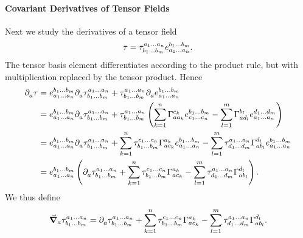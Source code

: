 \paragraph{Covariant Derivatives of Tensor Fields}
Next we study the derivatives of a tensor field
\begin{align*}
	\tau = \tensor*{\tau}{^{a_{1}\dots a_{n}}_{b_{1}\dots b_{m}}}\tensor*{e}{^{b_{1}\dots b_{m}}_{a_{1}\dots a_{n}}}.
\end{align*}
The tensor basis element differentiates according to the product rule, but with multiplication replaced by the tensor product. Hence
\begin{align*}
	\del{}{a}{\tau} &= \tensor*{e}{^{b_{1}\dots b_{m}}_{a_{1}\dots a_{n}}}\del{}{a}{\tensor*{\tau}{^{a_{1}\dots a_{n}}_{b_{1}\dots b_{m}}}} + \tensor*{\tau}{^{a_{1}\dots a_{n}}_{b_{1}\dots b_{m}}}\del{}{a}{\tensor*{e}{^{b_{1}\dots b_{m}}_{a_{1}\dots a_{n}}}} \\
	              &= \tensor*{e}{^{b_{1}\dots b_{m}}_{a_{1}\dots a_{n}}}\del{}{a}{\tensor*{\tau}{^{a_{1}\dots a_{n}}_{b_{1}\dots b_{m}}}} + \tensor*{\tau}{^{a_{1}\dots a_{n}}_{b_{1}\dots b_{m}}}\left(\sum\limits_{k = 1}^{n}\chris{c_{k}}{a}{a_{k}}\tensor*{e}{^{b_{1}\dots b_{m}}_{c_{1}\dots c_{n}}} - \sum\limits_{l = 1}^{m}\chris{b_{l}}{a}{d_{l}}\tensor*{e}{^{d_{1}\dots d_{m}}_{a_{1}\dots a_{n}}}\right) \\
	              &= \tensor*{e}{^{b_{1}\dots b_{m}}_{a_{1}\dots a_{n}}}\del{}{a}{\tensor*{\tau}{^{a_{1}\dots a_{n}}_{b_{1}\dots b_{m}}}} + \sum\limits_{k = 1}^{n}\tensor*{\tau}{^{c_{1}\dots c_{n}}_{b_{1}\dots b_{m}}}\chris{a_{k}}{a}{c_{k}}\tensor*{e}{^{b_{1}\dots b_{m}}_{a_{1}\dots a_{n}}} - \sum\limits_{l = 1}^{m}\tensor*{\tau}{^{a_{1}\dots a_{n}}_{d_{1}\dots d_{m}}}\chris{d_{l}}{a}{b_{l}}\tensor*{e}{^{b_{1}\dots b_{m}}_{a_{1}\dots a_{n}}} \\
	              &= \tensor*{e}{^{b_{1}\dots b_{m}}_{a_{1}\dots a_{n}}}\left(\del{}{a}{\tensor*{\tau}{^{a_{1}\dots a_{n}}_{b_{1}\dots b_{m}}}} + \sum\limits_{k = 1}^{n}\tensor*{\tau}{^{c_{1}\dots c_{n}}_{b_{1}\dots b_{m}}}\chris{a_{k}}{a}{c_{k}} - \sum\limits_{l = 1}^{m}\tensor*{\tau}{^{a_{1}\dots a_{n}}_{d_{1}\dots d_{m}}}\chris{d_{l}}{a}{b_{l}}\right).
\end{align*}
We thus define
\begin{align*}
	\dcov{a}{\tensor*{\tau}{^{a_{1}\dots a_{n}}_{b_{1}\dots b_{m}}}} = \del{}{a}{\tensor*{\tau}{^{a_{1}\dots a_{n}}_{b_{1}\dots b_{m}}}} + \sum\limits_{k = 1}^{n}\tensor*{\tau}{^{c_{1}\dots c_{n}}_{b_{1}\dots b_{m}}}\chris{a_{k}}{a}{c_{k}} - \sum\limits_{l = 1}^{m}\tensor*{\tau}{^{a_{1}\dots a_{n}}_{d_{1}\dots d_{m}}}\chris{d_{l}}{a}{b_{l}}.
\end{align*}

